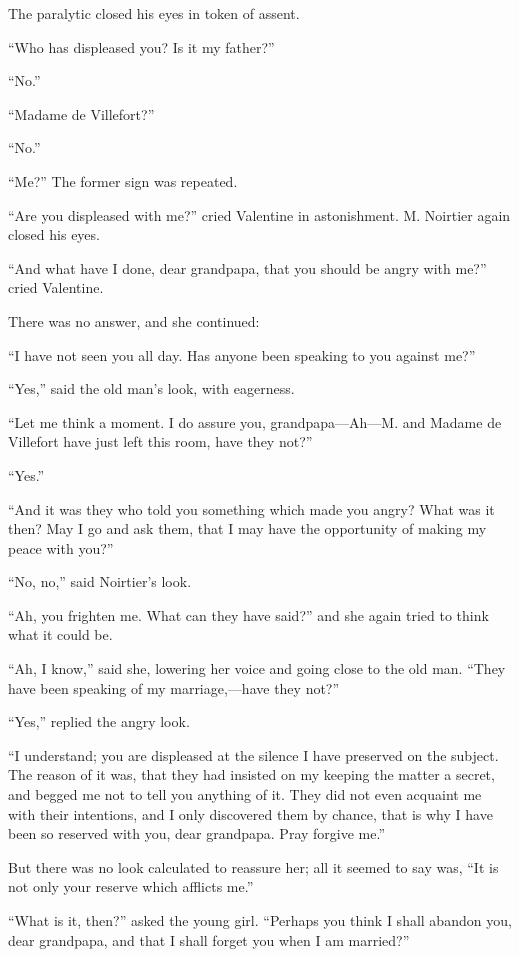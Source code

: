 The paralytic closed his eyes in token of assent.

“Who has displeased you? Is it my father?”

“No.”

“Madame de Villefort?”

“No.”

“Me?” The former sign was repeated.

“Are you displeased with me?” cried Valentine in astonishment. M.
Noirtier again closed his eyes.

“And what have I done, dear grandpapa, that you should be angry with
me?” cried Valentine.

There was no answer, and she continued:

“I have not seen you all day. Has anyone been speaking to you against
me?”

“Yes,” said the old man’s look, with eagerness.

“Let me think a moment. I do assure you, grandpapa—Ah—M. and Madame de
Villefort have just left this room, have they not?”

“Yes.”

“And it was they who told you something which made you angry? What was
it then? May I go and ask them, that I may have the opportunity of
making my peace with you?”

“No, no,” said Noirtier’s look.

“Ah, you frighten me. What can they have said?” and she again tried to
think what it could be.

“Ah, I know,” said she, lowering her voice and going close to the old
man. “They have been speaking of my marriage,—have they not?”

“Yes,” replied the angry look.

“I understand; you are displeased at the silence I have preserved on
the subject. The reason of it was, that they had insisted on my keeping
the matter a secret, and begged me not to tell you anything of it. They
did not even acquaint me with their intentions, and I only discovered
them by chance, that is why I have been so reserved with you, dear
grandpapa. Pray forgive me.”

But there was no look calculated to reassure her; all it seemed to say
was, “It is not only your reserve which afflicts me.”

“What is it, then?” asked the young girl. “Perhaps you think I shall
abandon you, dear grandpapa, and that I shall forget you when I am
married?”

